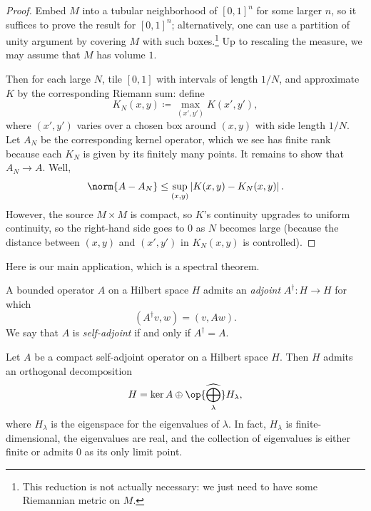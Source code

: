 \documentclass[../notes.tex]{subfiles}
\begin{document}
\begin{proof}
	Embed $M$ into a tubular neighborhood of $[0,1]^n$ for some larger $n$, so it suffices to prove the result for $[0,1]^n$; alternatively, one can use a partition of unity argument by covering $M$ with such boxes.\footnote{This reduction is not actually necessary: we just need to have some Riemannian metric on $M$.} Up to rescaling the measure, we may assume that $M$ has volume $1$.
	
	Then for each large $N$, tile $[0,1]$ with intervals of length $1/N$, and approximate $K$ by the corresponding Riemann sum: define
	\[K_N(x,y)\coloneqq\max_{(x',y')}K(x',y'),\]
	where $(x',y')$ varies over a chosen box around $(x,y)$ with side length $1/N$. Let $A_N$ be the corresponding kernel operator, which we see has finite rank because each $K_N$ is given by its finitely many points. It remains to show that $A_N\to A$. Well,
	\[\norm{A-A_N}\le\sup_{(x,y)}\left|K(x,y)-K_N(x,y)\right|.\]
	However, the source $M\times M$ is compact, so $K$'s continuity upgrades to uniform continuity, so the right-hand side goes to $0$ as $N$ becomes large (because the distance between $(x,y)$ and $(x',y')$ in $K_N(x,y)$ is controlled).
\end{proof}
Here is our main application, which is a spectral theorem.
\begin{definition}[adjoint]
	A bounded operator $A$ on a Hilbert space $H$ admits an \textit{adjoint} $A^\dagger\colon H\to H$ for which
	\[(A^\dagger v,w)=(v,Aw).\]
	We say that $A$ is \textit{self-adjoint} if and only if $A^\dagger=A$.
\end{definition}
\begin{theorem} \label{thm:hilbert-schmidt}
	Let $A$ be a compact self-adjoint operator on a Hilbert space $H$. Then $H$ admits an orthogonal decomposition
	\[H=\ker A\oplus\op{\widehat{\bigoplus_\lambda}}H_\lambda,\]
	where $H_\lambda$ is the eigenspace for the eigenvalues of $\lambda$. In fact, $H_\lambda$ is finite-dimensional, the eigenvalues are real, and the collection of eigenvalues is either finite or admits $0$ as its only limit point.
\end{theorem}
\end{document}
